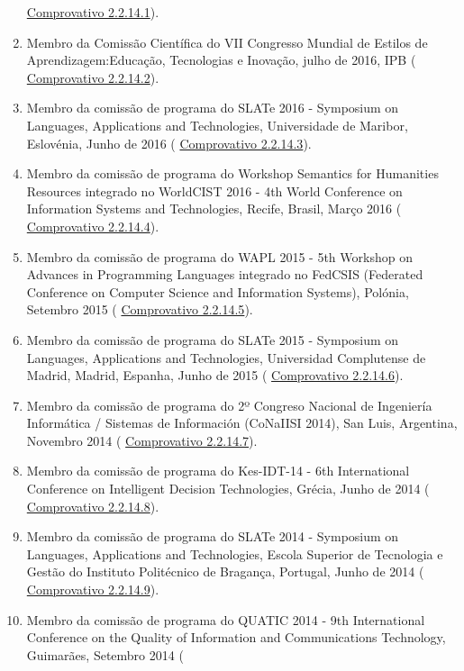 \documentclass[11pt]{article}
\begin{document}
\begin{enumerate}
{\href{run:ComprovativosCOCP/CPMDASD2016.pdf}{Comprovativo 2.2.14.1}).}
\item{Membro da Comissão Científica do VII Congresso Mundial de Estilos de Aprendizagem:Educação, Tecnologias e Inovação, julho de 2016, IPB (
\href{run:CongressoDocencia/ComissaoCientificaCMEA2016.pdf}{Comprovativo 2.2.14.2}).}
\item{Membro da comissão de programa do SLATe 2016 - Symposium on Languages, Applications and Technologies, Universidade de Maribor, Eslovénia, Junho de 2016 (
\href{run:ComprovativosCOCP/CPSLATE2016.pdf}{Comprovativo 2.2.14.3}). }
\item{Membro da comissão de programa do Workshop Semantics for Humanities Resources integrado no WorldCIST 2016 - 4th World Conference on Information Systems and Technologies, Recife, Brasil, Março 2016 (
\href{run:ComprovativosCOCP/WorldCist'16.pdf}{Comprovativo 2.2.14.4}). }
\item{Membro da comissão de programa do WAPL 2015 - 5th Workshop on Advances in Programming Languages integrado no FedCSIS (Federated Conference on Computer Science and Information Systems), Polónia, Setembro 2015 (
\href{run:ComprovativosCOCP/CPWAPL2015.pdf}{Comprovativo 2.2.14.5}).}
\item{Membro da comissão de programa do SLATe 2015 - Symposium on Languages, Applications and Technologies, Universidad Complutense de Madrid, Madrid, Espanha, Junho de 2015 (
\href{run:ComprovativosCOCP/CPSLATE2015.pdf}{Comprovativo 2.2.14.6}). }
\item{Membro da comissão de programa do 2º Congreso Nacional de Ingeniería Informática / Sistemas de Información (CoNaIISI 2014), San Luis, Argentina, Novembro 2014 (
\href{run:ComprovativosCOCP/CPCoNaIISI2014.pdf}{Comprovativo 2.2.14.7}).}
\item{Membro da comissão de programa do Kes-IDT-14 - 6th International Conference on Intelligent Decision Technologies, Grécia, Junho de 2014 (
\href{run:ComprovativosCOCP/CPKesIDT14.pdf}{Comprovativo 2.2.14.8}).}
\item{Membro da comissão de programa do SLATe 2014 - Symposium on Languages, Applications and Technologies, Escola Superior de Tecnologia e Gestão do Instituto Politécnico de Bragança, Portugal, Junho de 2014 (
\href{run:ComprovativosCOCP/CPSLATE2014.pdf}{Comprovativo 2.2.14.9}).}
\item{Membro da comissão de programa do QUATIC 2014 - 9th International Conference on the Quality of Information and Communications Technology, Guimarães, Setembro 2014 (
}
\end{enumerate}
\end{document}
